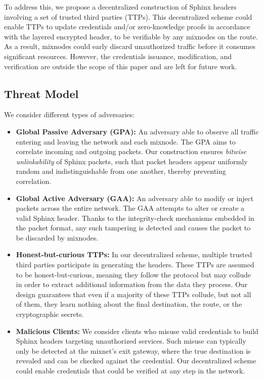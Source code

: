 To address this, we propose a decentralized construction of Sphinx headers involving a set of trusted third parties (TTPs). 
This decentralized scheme could enable TTPs to update credentials and/or zero-knowledge proofs in accordance with the layered encrypted header, to be verifiable by any mixnodes on the route.  
As a result, mixnodes could early discard unauthorized traffic before it consumes significant resources.
However, the credentials issuance, modification, and verification are outside the scope of this paper and are left for future work.


\subsection{Threat Model} 

We consider different types of adversaries:
\begin{itemize}
        \item \textbf{Global Passive Adversary (GPA):} An adversary able to observe all traffic entering and leaving the network and each mixnode. 
        The GPA aims to correlate incoming and outgoing packets. 
        Our construction ensures \emph{bitwise unlinkability} of Sphinx packets, such that packet headers appear uniformly random and indistinguishable from one another, thereby preventing correlation.
        
        \item \textbf{Global Active Adversary (GAA):} An adversary able to modify or inject packets across the entire network. 
        The GAA attempts to alter or create a valid Sphinx header. 
        Thanks to the integrity-check mechanisms embedded in the packet format, any such tampering is detected and causes the packet to be discarded by mixnodes.

        \item \textbf{Honest-but-curious TTPs:} 
        In our decentralized scheme, multiple trusted third parties participate in generating the headers. 
        These TTPs are assumed to be honest-but-curious, meaning they follow the protocol but may collude in order to extract additional information from the data they process.
        Our design guarantees that even if a majority of these TTPs collude, but not all of them, they learn nothing about the final destination, the route, or the cryptographic secrets.
        
        \item \textbf{Malicious Clients:} We consider clients who misuse valid credentials to build Sphinx headers targeting unauthorized services. 
        Such misuse can typically only be detected at the mixnet's exit gateway, where the true destination is revealed and can be checked against the credential. 
        Our decentralized scheme could enable credentials that could be verified at any step in the network.
\end{itemize}
